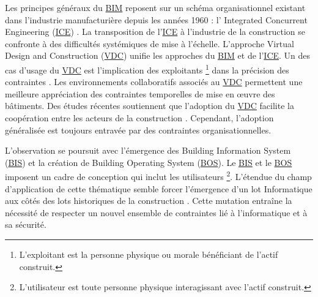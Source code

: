 \documentclass[a4paper,12pt]{article}
\begin{document}
Les principes généraux du \protect\hyperlink{gls-1}{\label{gls-1-use-7}BIM} reposent sur un schéma organisationnel existant dans l’industrie manufacturière depuis les années 1960 \autocite{caelenConsommateurAuCoeur2004a} : l' Integrated Concurrent Engineering
 (\protect\hyperlink{gls-2}{\label{gls-2-use-1}ICE}) \autocite{delsavioVirtualDesignConstruction2022}. La transposition de l’\protect\hyperlink{gls-2}{\label{gls-2-use-2}ICE} à l’industrie de la construction se confronte à des difficultés systémiques de mise à l’échelle. L’approche Virtual Design and Construction
 (\protect\hyperlink{gls-3}{\label{gls-3-use-1}VDC}) unifie les approches du \protect\hyperlink{gls-1}{\label{gls-1-use-8}BIM} et de l’\protect\hyperlink{gls-2}{\label{gls-2-use-3}ICE}. Un des cas d’usage du \protect\hyperlink{gls-3}{\label{gls-3-use-2}VDC} est  l’implication des exploitants \footnote{L’exploitant est la personne physique ou morale bénéficiant de l’actif construit.} dans la précision des contraintes \autocite{delsavioVirtualDesignConstruction2022,mathiaspettergustafssonRoleVDCProfessionals2015a}. Les environnements collaboratifs associés au \protect\hyperlink{gls-3}{\label{gls-3-use-3}VDC} permettent une meilleure appréciation des contraintes temporelles de mise en œuvre des bâtiments. Des études récentes soutiennent que l'adoption du \protect\hyperlink{gls-3}{\label{gls-3-use-4}VDC} facilite la coopération entre les acteurs de la construction \autocite{delsavioVirtualDesignConstruction2022,mugheesaslamIntegratedImplementationVirtual2021}. Cependant, l'adoption généralisée est toujours entravée par des contraintes organisationnelles.

L’observation se poursuit avec l’émergence des Building Information System
 (\protect\hyperlink{gls-4}{\label{gls-4-use-1}BIS}) et la création de Building Operating System
 (\protect\hyperlink{gls-5}{\label{gls-5-use-1}BOS}). Le \protect\hyperlink{gls-4}{\label{gls-4-use-2}BIS} et le \protect\hyperlink{gls-5}{\label{gls-5-use-2}BOS} imposent un cadre de conception qui inclut les utilisateurs \footnote{L’utilisateur est toute personne physique interagissant avec l’actif construit.}. L’étendue du champ d’application de cette thématique semble forcer l’émergence d’un lot Informatique aux côtés des lots historiques de la construction \autocites{mohamedyassinebenjemaaImplementationSolutionsIntegrees2017a}[][]{cottetSystemesTempsReel2005}{smartbuildingallianceBISBOSOutils2022}. Cette mutation entraîne la nécessité de respecter un nouvel ensemble de contraintes lié à l’informatique et à sa sécurité.
\end{document}

